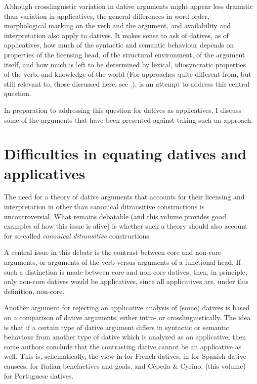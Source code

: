 \documentclass[output=paper,colorlinks,citecolor=brown,nonflat]{./langscibook}
\begin{document}
Although crosslinguistic variation in dative arguments might appear less dramatic than variation in applicatives, the general differences in word order, morphological marking on the verb and the argument, and availability and interpretation also apply to datives. It makes sense to ask of datives, as of applicatives, how much of the syntactic and semantic behaviour depends on properties of the licensing head, of the structural environment, of the argument itself, and how much is left to be determined by lexical, idiosyncratic properties of the verb, and knowledge of the world (For approaches quite different from, but still relevant to, those discussed here, see \citealt{Grimm2011, Maling2001}.).  is an attempt to address this central question. 

In preparation to addressing this question for datives as applicatives, I discuss some of the arguments that have been presented against taking such an approach.

\section{Difficulties in equating datives and applicatives}\label{sec:cuervo:2}

The need for a theory of dative arguments that accounts for their licensing and interpretation in other than canonical ditransitive constructions is uncontroversial. What remains debatable (and this volume provides good examples of how this issue is alive) is whether such a theory should also account for so-called \textit{canonical ditransitive} constructions. 

A central issue in this debate is the contrast between core and non-core arguments, or arguments of the verb versus arguments of a functional head. If such a distinction is made between core and non-core datives, then, in principle, only non-core datives would be applicatives, since all applicatives are, under this definition, non-core. 

Another argument for rejecting an applicative analysis of (some) datives is based on a comparison of dative arguments, either intra- or crosslinguistically. The idea is that if a certain type of dative argument differs in syntactic or semantic behaviour from another type of dative which is analyzed as an applicative, then some authors conclude that the contrasting dative cannot be an applicative as well. This is, schematically, the view in \citealt{BonehNash2012} for French datives, in \citet{Tubino2012} for Spanish dative causees, \citet{FolliHarley2006} for Italian benefactives and goals, and Cépeda \& Cyrino, (this volume) for Portuguese datives. 
\end{document}
